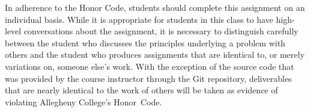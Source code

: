 In adherence to the Honor Code, students should complete this assignment on an individual basis. While it is appropriate
for students in this class to have high-level conversations about the assignment, it is necessary to distinguish
carefully between the student who discusses the principles underlying a problem with others and the student who produces
assignments that are identical to, or merely variations on, someone else's work.  With the exception of the source code
that was provided by the course instructor through the Git repository, deliverables that are nearly identical to the
work of others will be taken as evidence of violating Allegheny College's \mbox{Honor Code}.


